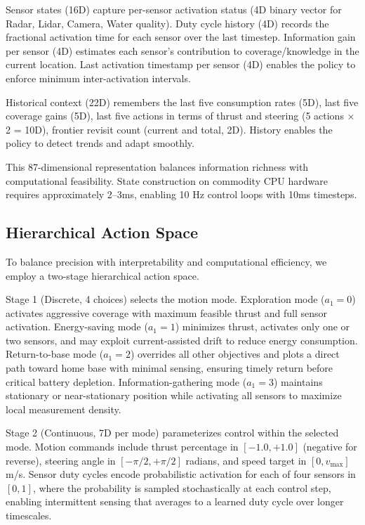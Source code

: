 Sensor states (16D) capture per-sensor activation status (4D binary vector for Radar, Lidar, Camera, Water quality). Duty cycle history (4D) records the fractional activation time for each sensor over the last timestep. Information gain per sensor (4D) estimates each sensor's contribution to coverage/knowledge in the current location. Last activation timestamp per sensor (4D) enables the policy to enforce minimum inter-activation intervals.

Historical context (22D) remembers the last five consumption rates (5D), last five coverage gains (5D), last five actions in terms of thrust and steering (5 actions × 2 = 10D), frontier revisit count (current and total, 2D). History enables the policy to detect trends and adapt smoothly.

This 87-dimensional representation balances information richness with computational feasibility. State construction on commodity CPU hardware requires approximately 2--3ms, enabling 10 Hz control loops with 10ms timesteps.

\subsection{Hierarchical Action Space}

To balance precision with interpretability and computational efficiency, we employ a two-stage hierarchical action space.

Stage 1 (Discrete, 4 choices) selects the motion mode. Exploration mode ($a_1 = 0$) activates aggressive coverage with maximum feasible thrust and full sensor activation. Energy-saving mode ($a_1 = 1$) minimizes thrust, activates only one or two sensors, and may exploit current-assisted drift to reduce energy consumption. Return-to-base mode ($a_1 = 2$) overrides all other objectives and plots a direct path toward home base with minimal sensing, ensuring timely return before critical battery depletion. Information-gathering mode ($a_1 = 3$) maintains stationary or near-stationary position while activating all sensors to maximize local measurement density.

Stage 2 (Continuous, 7D per mode) parameterizes control within the selected mode. Motion commands include thrust percentage in $[-1.0, +1.0]$ (negative for reverse), steering angle in $[-\pi/2, +\pi/2]$ radians, and speed target in $[0, v_{\max}]$ m/s. Sensor duty cycles encode probabilistic activation for each of four sensors in $[0, 1]$, where the probability is sampled stochastically at each control step, enabling intermittent sensing that averages to a learned duty cycle over longer timescales.

